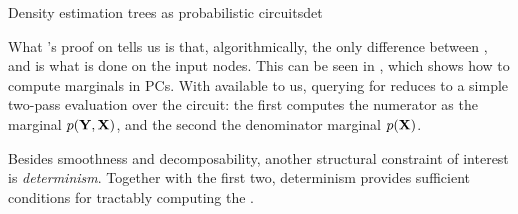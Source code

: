 \begin{example}[sidebyside,lefthand width=0.55\textwidth]{Density estimation trees as probabilistic circuits}{det}
\end{example}

What 's proof on  tells us is that, algorithmically, the
only difference between \evi{}, \mar{} and \con{} is what is done on the input nodes. This can be
seen in , which shows how to compute marginals in PCs. With \mar{} available to us,
querying for \con{} reduces to a simple two-pass evaluation over the circuit: the first computes
the numerator as the marginal $p(\mathbf{Y},\mathbf{X})$, and the second the denominator marginal
$p(\mathbf{X})$.

Besides smoothness and decomposability, another structural constraint of interest is
\emph{determinism}. Together with the first two, determinism provides sufficient conditions for
tractably computing the \map{}.

